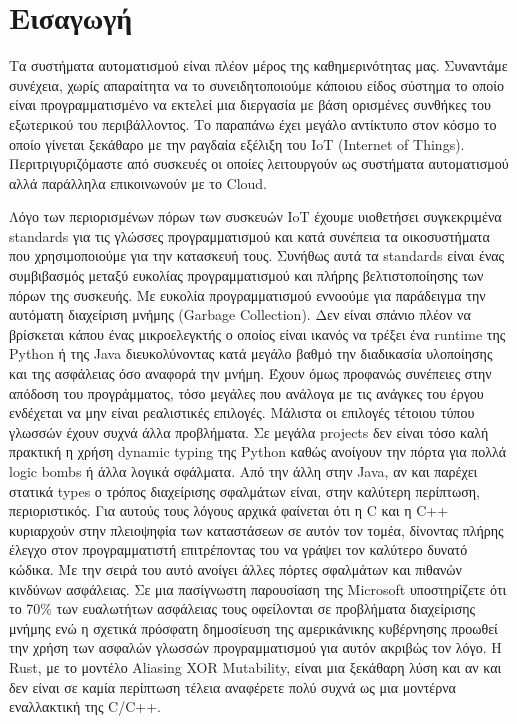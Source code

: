 \section{Εισαγωγή}

Τα συστήματα αυτοματισμού είναι πλέον μέρος της καθημερινότητας
μας. Συναντάμε συνέχεια, χωρίς απαραίτητα να το συνειδητοποιούμε
κάποιου είδος σύστημα το οποίο είναι προγραμματισμένο να εκτελεί μια
διεργασία με βάση ορισμένες συνθήκες του εξωτερικού του
περιβάλλοντος. Το παραπάνω έχει μεγάλο αντίκτυπο στον κόσμο το οποίο
γίνεται ξεκάθαρο με την ραγδαία εξέλιξη του IoT (Internet of Things).
Περιτριγυριζόμαστε από συσκευές οι οποίες λειτουργούν ως συστήματα
αυτοματισμού αλλά παράλληλα επικοινωνούν με το Cloud.

Λόγο των περιορισμένων πόρων των συσκευών IoT έχουμε υιοθετήσει
συγκεκριμένα standards για τις γλώσσες προγραμματισμού και κατά
συνέπεια τα οικοσυστήματα που χρησιμοποιούμε για την κατασκευή
τους. Συνήθως αυτά τα standards είναι ένας συμβιβασμός μεταξύ ευκολίας
προγραμματισμού και πλήρης βελτιστοποίησης των πόρων της συσκευής. Με
ευκολία προγραμματισμού εννοούμε για παράδειγμα την αυτόματη
διαχείριση μνήμης (Garbage Collection). Δεν είναι σπάνιο πλέον να
βρίσκεται κάπου ένας μικροελεγκτής ο οποίος είναι ικανός να τρέξει ένα
runtime της Python ή της Java διευκολύνοντας κατά μεγάλο βαθμό την
διαδικασία υλοποίησης και της ασφάλειας όσο αναφορά την μνήμη. Έχουν
όμως προφανώς συνέπειες στην απόδοση του προγράμματος, τόσο μεγάλες
που ανάλογα με τις ανάγκες του έργου ενδέχεται να μην είναι
ρεαλιστικές επιλογές. Μάλιστα οι επιλογές τέτοιου τύπου γλωσσών έχουν
συχνά άλλα προβλήματα. Σε μεγάλα projects δεν είναι τόσο καλή πρακτική
η χρήση dynamic typing της Python καθώς ανοίγουν την πόρτα για πολλά
logic bombs ή άλλα λογικά σφάλματα. Από την άλλη στην Java, αν και
παρέχει στατικά types ο τρόπος διαχείρισης σφαλμάτων είναι, στην
καλύτερη περίπτωση, περιοριστικός. Για αυτούς τους λόγους αρχικά
φαίνεται ότι η C και η C++ κυριαρχούν στην πλειοψηφία των καταστάσεων
σε αυτόν τον τομέα, δίνοντας πλήρης έλεγχο στον προγραμματιστή
επιτρέποντας του να γράψει τον καλύτερο δυνατό κώδικα. Με την σειρά
του αυτό ανοίγει άλλες πόρτες σφαλμάτων και πιθανών κινδύνων ασφάλειας.
Σε μια πασίγνωστη παρουσίαση της Microsoft υποστηρίζετε ότι το 70\%
των ευαλωτήτων ασφάλειας τους οφείλονται σε προβλήματα διαχείρισης
μνήμης \cite{catalin_microsoft_nodate} \cite{thomas_proactive_nodate}
ενώ η σχετικά πρόσφατη δημοσίευση της αμερικάνικης κυβέρνησης προωθεί
την χρήση των ασφαλών γλωσσών προγραμματισμού
\cite{ann_marie_corvin_world_nodate} για αυτόν ακριβώς τον λόγο. Η
Rust, με το μοντέλο Aliasing XOR Mutability, είναι μια ξεκάθαρη λύση και αν
και δεν είναι σε καμία περίπτωση τέλεια αναφέρετε πολύ συχνά ως μια
μοντέρνα εναλλακτική της C/C++. 

